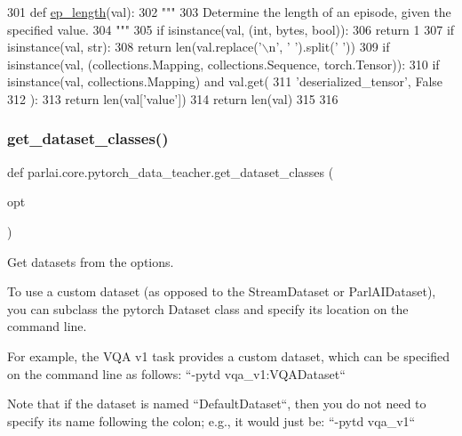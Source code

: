 \begin{DoxyCode}
301 \textcolor{keyword}{def }\hyperlink{namespaceparlai_1_1core_1_1pytorch__data__teacher_afbd22acd239efcdb6afb94db83ee3493}{ep\_length}(val):
302     \textcolor{stringliteral}{"""}
303 \textcolor{stringliteral}{    Determine the length of an episode, given the specified value.}
304 \textcolor{stringliteral}{    """}
305     \textcolor{keywordflow}{if} isinstance(val, (int, bytes, bool)):
306         \textcolor{keywordflow}{return} 1
307     \textcolor{keywordflow}{if} isinstance(val, str):
308         \textcolor{keywordflow}{return} len(val.replace(\textcolor{stringliteral}{'\(\backslash\)n'}, \textcolor{stringliteral}{' '}).split(\textcolor{stringliteral}{' '}))
309     \textcolor{keywordflow}{if} isinstance(val, (collections.Mapping, collections.Sequence, torch.Tensor)):
310         \textcolor{keywordflow}{if} isinstance(val, collections.Mapping) \textcolor{keywordflow}{and} val.get(
311             \textcolor{stringliteral}{'deserialized\_tensor'}, \textcolor{keyword}{False}
312         ):
313             \textcolor{keywordflow}{return} len(val[\textcolor{stringliteral}{'value'}])
314         \textcolor{keywordflow}{return} len(val)
315 
316 
\end{DoxyCode}
\mbox{\label{namespaceparlai_1_1core_1_1pytorch__data__teacher_acd56d9ac5d68831c1e91690f26eb2328}} 
\subsubsection{\texorpdfstring{get\+\_\+dataset\+\_\+classes()}{get\_dataset\_classes()}}
{\footnotesize\ttfamily def parlai.\+core.\+pytorch\+\_\+data\+\_\+teacher.\+get\+\_\+dataset\+\_\+classes (\begin{DoxyParamCaption}\item[{}]{opt }\end{DoxyParamCaption})}

\begin{DoxyVerb}Get datasets from the options.

To use a custom dataset (as opposed to the StreamDataset or ParlAIDataset),
you can subclass the pytorch Dataset class and specify its location on the
command line.

For example, the VQA v1 task provides a custom dataset, which can
be specified on the command line as follows: ``-pytd vqa_v1:VQADataset``

Note that if the dataset is named ``DefaultDataset``, then you do
not need to specify its name following the colon; e.g., it
would just be: ``-pytd vqa_v1``
\end{DoxyVerb}
 


